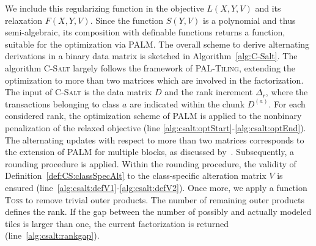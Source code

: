 We include this regularizing function in the objective $L(X,Y,V)$ and its relaxation $F(X,Y,V)$. Since the function $S(Y,V)$ is a polynomial and thus semi-algebraic, its composition with definable functions returns a \KL function, suitable for the optimization via PALM. The overall scheme to derive alternating derivations in a binary data matrix is sketched in Algorithm~\ref{alg:C-Salt}. The algorithm \textsc{C-Salt} largely follows the framework of \textsc{PAL-Tiling}, extending the optimization to more than two matrices which are involved in the factorization. The input of \textsc{C-Salt} is the data matrix $D$ and the rank increment $\Delta_r$, where the transactions belonging to class $a$ are indicated within the chunk $D^{(a)}$. For each considered rank, the optimization scheme of PALM is applied to the nonbinary penalization of the relaxed objective (line \ref{alg:csalt:optStart}-\ref{alg:csalt:optEnd}). The alternating updates with respect to more than two matrices corresponds to the extension of PALM for multiple blocks, as discussed by~\cite{bolte2014proximal}.  Subsequently, a rounding procedure is applied. Within the rounding procedure, the validity of Definition~\ref{def:CS:classSpecAlt} to the class-specific alteration matrix $V$ is ensured (line~\ref{alg:csalt:defV1}-\ref{alg:csalt:defV2}). Once more, we apply a function \textsc{Toss} to remove trivial outer products. The number of remaining outer products defines the rank. If the gap between the number of possibly and actually modeled tiles is larger than one, the current factorization is returned (line~\ref{alg:csalt:rankgap}).
